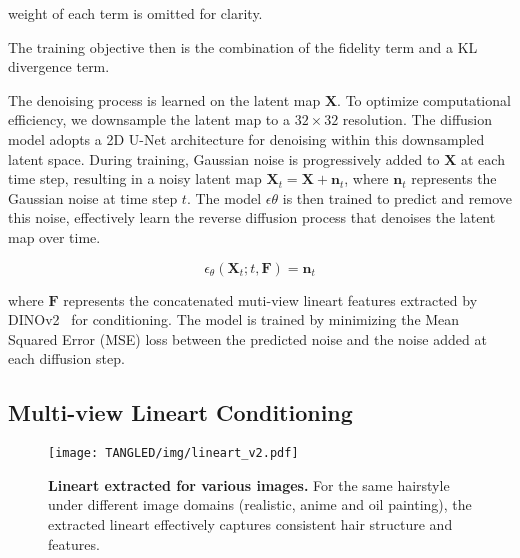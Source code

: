 weight of each term is omitted for clarity. 

The training objective then is the combination of the fidelity term and a KL divergence term.


The denoising process is learned on the latent map $\mathbf{X}$. To optimize computational efficiency, we downsample the latent map to a $32 \times 32$ resolution. The diffusion model adopts a 2D U-Net architecture for denoising within this downsampled latent space. During training, Gaussian noise is progressively added to $\mathbf{X}$ at each time step, resulting in a noisy latent map $\mathbf{X}_t = \mathbf{X} + \mathbf{n}_t$, where $\mathbf{n}_t$ represents the Gaussian noise at time step $t$. The model $\epsilon{\theta}$ is then trained to predict and remove this noise, effectively learn the reverse diffusion process that denoises the latent map over time.

\begin{equation}    
\epsilon_\theta(\mathbf{X}_t; t, \mathbf{F}) = \mathbf{n}_t
\end{equation}

where $\mathbf{F}$ represents the concatenated muti-view lineart features extracted by DINOv2~\cite{oquab2024dinov2} for conditioning. The model is trained by minimizing the Mean Squared Error (MSE) loss between the predicted noise and the noise added at each diffusion step.


\subsection{Multi-view Lineart Conditioning}
\label{sec:image_conditioning}


\begin{figure}[tbp]
  \texttt{[image: TANGLED/img/lineart\_v2.pdf]}
  \caption{\textbf{Lineart extracted for various images.} For the same hairstyle under different image domains (realistic, anime and oil painting), the extracted lineart effectively captures consistent hair structure and features. }

  \label{fig:lineart}
\end{figure}

